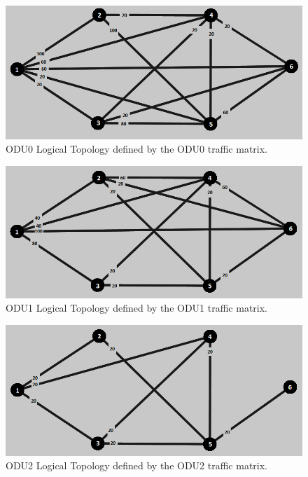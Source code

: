 \begin{figure}[H]
\centering
\includegraphics[width=13cm]{sdf/heuristic/transparent_protection/high/logical_topology_odu0_high}
\caption{ODU0 Logical Topology defined by the ODU0 traffic matrix.}
\label{logical_ODU0_protection_ref_high_heuristic_transparent}
\end{figure}

\begin{figure}[H]
\centering
\includegraphics[width=13cm]{sdf/heuristic/transparent_protection/high/logical_topology_odu1_high}
\caption{ODU1 Logical Topology defined by the ODU1 traffic matrix.}
\label{logical_ODU1_protection_ref_high_heuristic_transparent}
\end{figure}

\begin{figure}[H]
\centering
\includegraphics[width=13cm]{sdf/heuristic/transparent_protection/high/logical_topology_odu2_high}
\caption{ODU2 Logical Topology defined by the ODU2 traffic matrix.}
\label{logical_ODU2_protection_ref_high_heuristic_transparent}
\end{figure}

